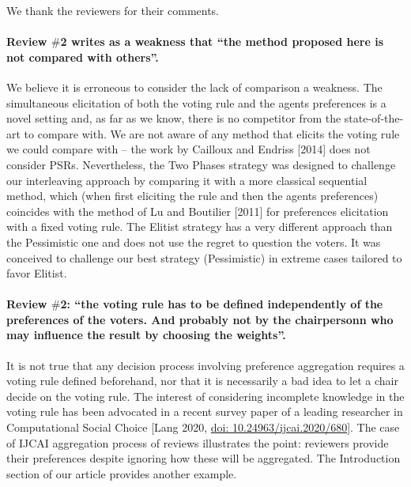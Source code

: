 \documentclass{article}
\newcommand{\commentOC}[1]{\textcolor{blue}{\small$\big[$OC: #1$\big]$}}
\begin{document}
\addtocounter{pagecount}{-4}

	We thank the reviewers for their comments.
	
\paragraph{Review $\#$2 writes as a weakness that “the method proposed here is not compared with others”.}
We believe it is erroneous to consider the lack of comparison a weakness. The simultaneous elicitation of both the voting rule and the agents preferences is a novel setting and, as far as we know, there is no competitor from the state-of-the-art to compare with. 
We are not aware of any method that elicits the voting rule we could compare with – the work by Cailloux and Endriss [2014] does not consider PSRs. Nevertheless, the Two Phases strategy was designed to challenge our interleaving approach by comparing it with a more classical sequential method, which (when first eliciting the rule and then the agents preferences) coincides with the method of Lu and Boutilier [2011] for preferences elicitation with a fixed voting rule.
The Elitist strategy has a very different approach than the Pessimistic one and does not use the regret to question the voters. It was conceived to challenge our best strategy (Pessimistic) in extreme cases tailored to favor Elitist.

\paragraph{Review $\#$2: “the voting rule has to be defined independently of the preferences of the voters. And probably not by the chairpersonn who may influence the result by choosing the weights”.}
It is not true that any decision process involving preference aggregation requires a voting rule defined beforehand, nor that it is necessarily a bad idea to let a chair decide on the voting rule. The interest of considering incomplete knowledge in the voting rule has been advocated in a recent survey paper of a leading researcher in Computational Social Choice [Lang 2020, \href{https://doi.org/10.24963/ijcai.2020/680}{doi: 10.24963/ijcai.2020/680}]. The case of IJCAI aggregation process of reviews illustrates the point: reviewers provide their preferences despite ignoring how these will be aggregated. The Introduction section of our article provides another example.
\end{document}
